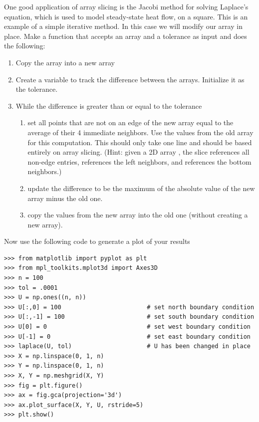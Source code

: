 \begin{problem}
One good application of array slicing is the Jacobi method for solving Laplace's 
equation, which is used to model steady-state heat flow, on a square.
This is an example of a simple iterative method.
In this case we will modify our array in place.
Make a function that accepts an array and a tolerance as input and does the following:
\begin{enumerate}
\item Copy the array into a new array
\item Create a variable to track the difference between the arrays.
Initialize it as the tolerance.
\item While the difference is greater than or equal to the tolerance
\begin{enumerate}
	\item set all points that are not on an edge of the new array equal to the average of 
    their 4 immediate neighbors.
    Use the values from the old array for this computation.
    This should only take one line and should be based entirely on array slicing.
    (Hint: given a 2D array , the slice  references all non-edge 
    entries,  references the left neighbors, and  
    references the bottom neighbors.)
	\item update the difference to be the maximum of the absolute value of the new array minus the old one.
	\item copy the values from the new array into the old one (without creating a new array).
\end{enumerate}
\end{enumerate}

Now use the following code to generate a plot of your results
\begin{lstlisting}
>>> from matplotlib import pyplot as plt
>>> from mpl_toolkits.mplot3d import Axes3D
>>> n = 100
>>> tol = .0001
>>> U = np.ones((n, n))
>>> U[:,0] = 100                        # set north boundary condition
>>> U[:,-1] = 100                       # set south boundary condition
>>> U[0] = 0                            # set west boundary condition
>>> U[-1] = 0                           # set east boundary condition
>>> laplace(U, tol)                     # U has been changed in place
>>> X = np.linspace(0, 1, n)
>>> Y = np.linspace(0, 1, n)
>>> X, Y = np.meshgrid(X, Y)
>>> fig = plt.figure()
>>> ax = fig.gca(projection='3d')
>>> ax.plot_surface(X, Y, U, rstride=5)
>>> plt.show()
\end{lstlisting}


\end{problem}
